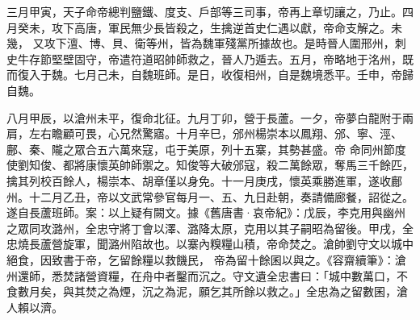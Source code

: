 \begin{pinyinscope}
 三月甲寅，天子命帝總判鹽鐵、度支、戶部等三司事，帝再上章切讓之，乃止。四月癸未，攻下高唐，軍民無少長皆殺之，生擒逆首史仁遇以獻，帝命支解之。未幾，
 又攻下澶、博、貝、衛等州，皆為魏軍殘黨所據故也。是時晉人圍邢州，刺史牛存節堅壁固守，帝遣符道昭帥師救之，晉人乃遁去。五月，帝略地于洺州，既而復入于魏。七月己未，自魏班師。是日，收復相州，自是魏境悉平。壬申，帝歸自魏。



 八月甲辰，以滄州未平，復命北征。九月丁卯，營于長蘆。一夕，帝夢白龍附于兩肩，左右瞻顧可畏，心兄然驚寤。十月辛巳，邠州楊崇本以鳳翔、邠、寧、涇、鄜、秦、隴之眾合五六萬來寇，屯于美原，列十五寨，其勢甚盛。帝
 命同州節度使劉知俊、都將康懷英帥師禦之。知俊等大破邠寇，殺二萬餘眾，奪馬三千餘匹，擒其列校百餘人，楊崇本、胡章僅以身免。十一月庚戌，懷英乘勝進軍，遂收鄜州。十二月乙丑，帝以文武常參官每月一、五、九日赴朝，奏請備廊餐，詔從之。遂自長蘆班師。案：以上疑有闕文。據《舊唐書·哀帝紀》：戊辰，李克用與幽州之眾同攻潞州，全忠守將丁會以澤、潞降太原，克用以其子嗣昭為留後。甲戌，全忠燒長蘆營旋軍，聞潞州陷故也。以寨內糗糧山積，帝命焚之。滄帥劉守文以城中絕食，因致書于帝，乞留餘糧以救饑民，
 帝為留十餘囷以與之。《容齋續筆》：滄州還師，悉焚諸營資糧，在舟中者鑿而沉之。守文遺全忠書曰：「城中數萬口，不食數月矣，與其焚之為煙，沉之為泥，願乞其所餘以救之。」全忠為之留數囷，滄人賴以濟。



\end{pinyinscope}